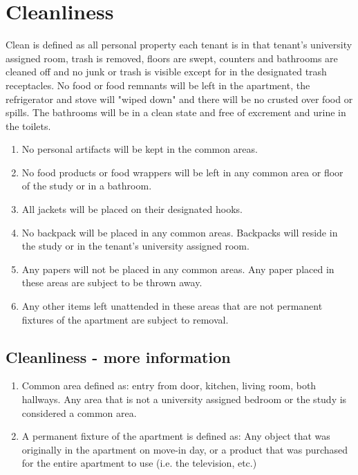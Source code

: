 \documentclass[10pt]{article}
\begin{document}
\section{Cleanliness}
Clean is defined as all personal property each tenant is in that tenant’s university assigned room, trash is removed, floors are swept, counters and bathrooms are cleaned off and no junk or trash is visible except for in the designated trash receptacles. No food or food remnants will be left in the apartment, the refrigerator and stove will "wiped down" and there will be no crusted over food or spills. The bathrooms will be in a clean state and free of excrement and urine in the toilets.
\begin{enumerate}
	\item No personal artifacts will be kept in the common areas.
	\item No food products or food wrappers will be left in any common area or floor of the study or in a bathroom.
	\item All jackets will be placed on their designated hooks.
	\item No backpack will be placed in any common areas. Backpacks will reside in the study or in the tenant’s university assigned room.
	\item Any papers will not be placed in any common areas. Any paper placed in these areas are subject to be thrown away.
	\item Any other items left unattended in these areas that are not permanent fixtures of the apartment are subject to removal.

\end{enumerate}
\subsection{Cleanliness - more information}
\begin{enumerate}
	\item Common area defined as: entry from door, kitchen, living room, both hallways. Any area that is not a university assigned bedroom or the study is considered a common area.
	\item A permanent fixture of the apartment is defined as: Any object that was originally in the apartment on move-in day, or a product that was purchased for the entire apartment to use (i.e. the television, etc.)
\end{enumerate}
\end{document}
